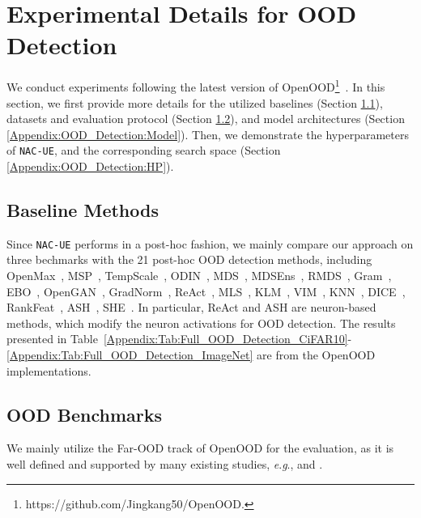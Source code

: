 \documentclass{article} \usepackage{iclr2024_conference,times}
\newcommand{\eg}{\textit{e}.\textit{g}.}
\begin{document}
\section{Experimental Details for OOD Detection}
\label{Appendix:OOD_Detection_Details}
We conduct experiments following the latest version of OpenOOD\footnote{https://github.com/Jingkang50/OpenOOD.}~\citep{Setup:OpenOOD,Setup:OpenOODv1.5}. 
In this section, we first provide more details for the utilized baselines (Section \ref{Appendix:OOD_Detection:Baseline}), datasets and evaluation protocol (Section \ref{Appendix:OOD_Detection:Benchmark}), and model architectures (Section \ref{Appendix:OOD_Detection:Model}). Then, we demonstrate the hyperparameters of \texttt{NAC-UE}, and the corresponding search space (Section \ref{Appendix:OOD_Detection:HP}).


\subsection{Baseline Methods} 
\label{Appendix:OOD_Detection:Baseline}
Since \texttt{NAC-UE} performs in a post-hoc fashion, we mainly compare our approach on three bechmarks with the 21 post-hoc OOD detection methods, including OpenMax~\citep{ood_example1}, MSP~\citep{OOD_Detect:MSP}, TempScale~\citep{OOD_Detect:TempScale}, ODIN~\citep{OOD_Detect:ODIN}, MDS~\citep{OOD_Detect:Mahalanobis}, MDSEns~\citep{OOD_Detect:Mahalanobis}, RMDS~\citep{OOD_Detect:RMDS}, Gram~\citep{OOD_Detect:Gram}, EBO~\citep{OOD_Detect:Energy}, OpenGAN~\citep{OOD_Detect:OpenGAN}, GradNorm~\citep{OOD_Detect:GradNorm}, ReAct~\citep{OOD_Detect:ReAct}, MLS~\citep{OOD_Detect:MLS}, KLM~\citep{OOD_Detect:MLS}, VIM~\citep{OOD_Detect:ViM}, KNN~\citep{OOD_Detect:KNN}, DICE~\citep{OOD_Detect:DICE}, RankFeat~\citep{OOD_Detect:RankFeat}, ASH~\citep{OOD_Detect:SimpleAct}, SHE~\citep{OOD_Detect:SHE}. 
In particular, ReAct and ASH are neuron-based methods, which modify the neuron activations for OOD detection.
The results presented in Table~\ref{Appendix:Tab:Full_OOD_Detection_CiFAR10}-\ref{Appendix:Tab:Full_OOD_Detection_ImageNet} are from the OpenOOD implementations.

\subsection{OOD Benchmarks} 
\label{Appendix:OOD_Detection:Benchmark}
We mainly utilize the Far-OOD track of OpenOOD for the evaluation, as it is well defined and supported by many existing studies, \eg, \cite{OOD_Detect:ViM} and \cite{OOD_Detect:InOut_Study}.
\end{document}
